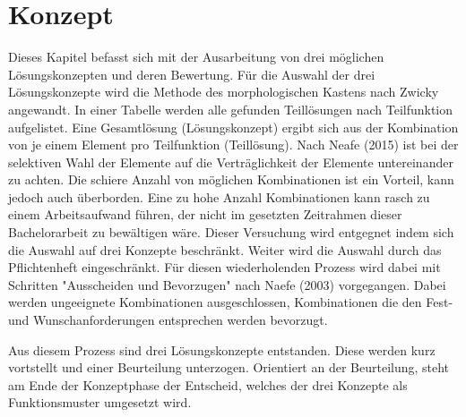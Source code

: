 \newpage
\section{Konzept}
Dieses Kapitel befasst sich mit der Ausarbeitung von drei möglichen Lösungskonzepten und deren Bewertung. Für die Auswahl der drei Lösungskonzepte wird die Methode des morphologischen Kastens nach Zwicky angewandt. In einer Tabelle werden alle gefunden Teillösungen nach Teilfunktion aufgelistet. Eine Gesamtlösung (Lösungskonzept) ergibt sich aus der Kombination von je einem Element pro Teilfunktion (Teillösung). Nach Neafe (2015) ist bei der selektiven Wahl der Elemente auf die Verträglichkeit der Elemente untereinander zu achten.
\newline
Die schiere Anzahl von möglichen Kombinationen ist ein Vorteil, kann jedoch auch überborden. Eine zu hohe Anzahl Kombinationen kann rasch zu einem Arbeitsaufwand führen, der nicht im gesetzten Zeitrahmen dieser Bachelorarbeit zu bewältigen wäre. Dieser Versuchung wird entgegnet indem sich die Auswahl auf drei Konzepte beschränkt. Weiter wird die Auswahl durch das Pflichtenheft eingeschränkt. Für diesen wiederholenden Prozess wird dabei mit Schritten "Ausscheiden und Bevorzugen" nach Naefe (2003) vorgegangen. Dabei werden ungeeignete Kombinationen ausgeschlossen, Kombinationen die den Fest- und Wunschanforderungen entsprechen werden bevorzugt.

Aus diesem Prozess sind drei Lösungskonzepte entstanden. Diese werden kurz vortstellt und einer Beurteilung unterzogen. Orientiert an der Beurteilung, steht am Ende der Konzeptphase der Entscheid, welches der drei Konzepte als Funktionsmuster umgesetzt wird.
